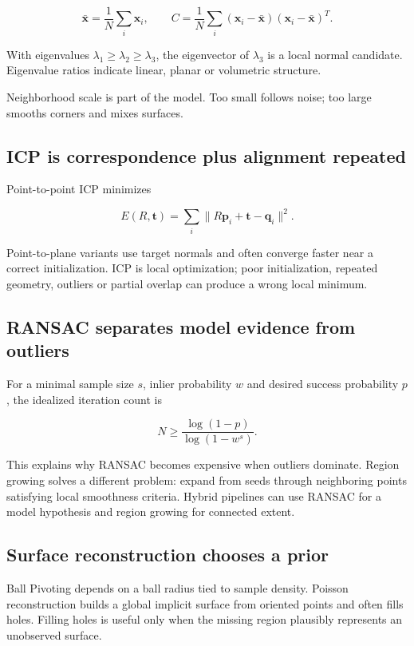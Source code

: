 \[
\bar{\mathbf x}=\frac1N\sum_i\mathbf x_i,
\qquad
C=\frac1N\sum_i(\mathbf x_i-\bar{\mathbf x})(\mathbf x_i-\bar{\mathbf x})^T.
\]

With eigenvalues \(\lambda_1\ge\lambda_2\ge\lambda_3\), the eigenvector of \(\lambda_3\) is a local normal candidate. Eigenvalue ratios indicate linear, planar or volumetric structure.

Neighborhood scale is part of the model. Too small follows noise; too large smooths corners and mixes surfaces.

\subsection{ICP is correspondence plus alignment repeated}\label{icp-is-correspondence-plus-alignment-repeated}

Point-to-point ICP minimizes

\[
E(R,\mathbf t)=\sum_i\|R\mathbf p_i+\mathbf t-\mathbf q_i\|^2.
\]

Point-to-plane variants use target normals and often converge faster near a correct initialization. ICP is local optimization; poor initialization, repeated geometry, outliers or partial overlap can produce a wrong local minimum.

\subsection{RANSAC separates model evidence from outliers}\label{ransac-separates-model-evidence-from-outliers}

For a minimal sample size \(s\), inlier probability \(w\) and desired success probability \(p\), the idealized iteration count is

\[
N\ge \frac{\log(1-p)}{\log(1-w^s)}.
\]

This explains why RANSAC becomes expensive when outliers dominate. Region growing solves a different problem: expand from seeds through neighboring points satisfying local smoothness criteria. Hybrid pipelines can use RANSAC for a model hypothesis and region growing for connected extent.

\subsection{Surface reconstruction chooses a prior}\label{surface-reconstruction-chooses-a-prior}

Ball Pivoting depends on a ball radius tied to sample density. Poisson reconstruction builds a global implicit surface from oriented points and often fills holes. Filling holes is useful only when the missing region plausibly represents an unobserved surface.

